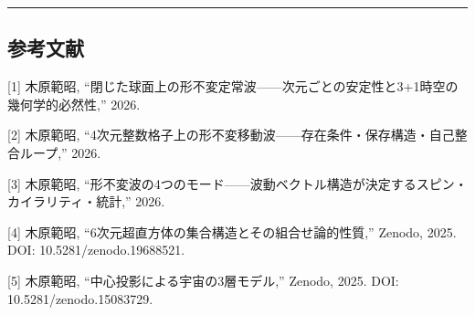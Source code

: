 \documentclass[
  a4paper,11pt]{ltjsarticle}
\theoremstyle{definition}
\theoremstyle{remark}
\begin{document}
\begin{center}\rule{0.5\linewidth}{0.5pt}\end{center}

\subsection{参考文献}\label{ux53c2ux8003ux6587ux732e}

{[}1{]} 木原範昭,
``閉じた球面上の形不変定常波------次元ごとの安定性と3+1時空の幾何学的必然性,''
2026.

{[}2{]} 木原範昭,
``4次元整数格子上の形不変移動波------存在条件・保存構造・自己整合ループ,''
2026.

{[}3{]} 木原範昭,
``形不変波の4つのモード------波動ベクトル構造が決定するスピン・カイラリティ・統計,''
2026.

{[}4{]} 木原範昭, ``6次元超直方体の集合構造とその組合せ論的性質,''
Zenodo, 2025. DOI: 10.5281/zenodo.19688521.

{[}5{]} 木原範昭, ``中心投影による宇宙の3層モデル,'' Zenodo, 2025. DOI:
10.5281/zenodo.15083729.
\end{document}
